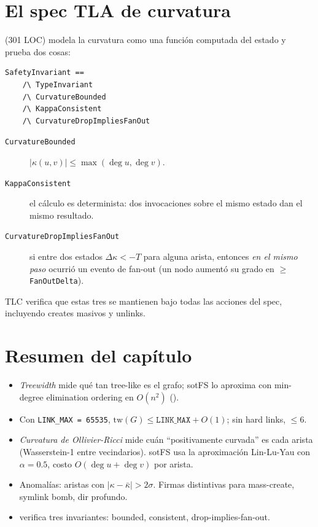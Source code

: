 \section{El spec TLA de curvatura}

 (301 LOC) modela la curvatura como
una función computada del estado y prueba dos cosas:

\begin{lstlisting}[language=tla, caption={Invariantes de curvatura
en TLA.}, label={lst:curvature-tla}]
SafetyInvariant ==
    /\ TypeInvariant
    /\ CurvatureBounded
    /\ KappaConsistent
    /\ CurvatureDropImpliesFanOut
\end{lstlisting}

\begin{description}
  \item[\texttt{CurvatureBounded}] $|\kappa(u,v)| \leq \max(\deg u,
    \deg v)$.
  \item[\texttt{KappaConsistent}] el cálculo es determinista: dos
    invocaciones sobre el mismo estado dan el mismo resultado.
  \item[\texttt{CurvatureDropImpliesFanOut}] si entre dos estados
    $\Delta\kappa < -T$ para alguna arista, entonces \emph{en el mismo
    paso} ocurrió un evento de fan-out (un nodo aumentó su grado en
    $\geq$ \texttt{FanOutDelta}).
\end{description}

TLC verifica que estas tres se mantienen bajo todas las acciones del
spec, incluyendo creates masivos y unlinks.

\section*{Resumen del capítulo}

\begin{itemize}
  \item \emph{Treewidth} mide qué tan tree-like es el grafo; sotFS lo
    aproxima con min-degree elimination ordering en $O(n^2)$
    ().
  \item Con \texttt{LINK\_MAX = 65535}, $\mathrm{tw}(G) \leq
    \texttt{LINK\_MAX} + O(1)$; sin hard links, $\leq 6$.
  \item \emph{Curvatura de Ollivier-Ricci} mide cuán ``positivamente
    curvada'' es cada arista (Wasserstein-1 entre vecindarios). sotFS
    usa la aproximación Lin-Lu-Yau con $\alpha = 0.5$, costo
    $O(\deg u + \deg v)$ por arista.
  \item Anomalías: aristas con $|\kappa - \bar{\kappa}| > 2\sigma$.
    Firmas distintivas para mass-create, symlink bomb, dir profundo.
  \item {} verifica tres invariantes:
    bounded, consistent, drop-implies-fan-out.
\end{itemize}

